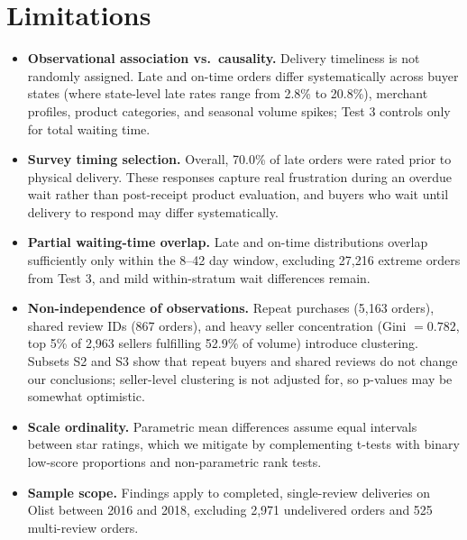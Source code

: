 \documentclass[10pt,a4paper,twocolumn]{article}
\begin{document}
\section{Limitations}
\begin{itemize}
  \item \textbf{Observational association vs.\ causality.} Delivery timeliness is not randomly assigned. Late and
  on-time orders differ systematically across buyer states (where state-level late rates range from 2.8\% to 20.8\%),
  merchant profiles, product categories, and seasonal volume spikes; Test 3 controls only for total waiting time.
  \item \textbf{Survey timing selection.} Overall, 70.0\% of late orders were rated prior to physical delivery. These
  responses capture real frustration during an overdue wait rather than post-receipt product evaluation, and buyers who
  wait until delivery to respond may differ systematically.
  \item \textbf{Partial waiting-time overlap.} Late and on-time distributions overlap sufficiently only within the
  8--42 day window, excluding 27,216 extreme orders from Test 3, and mild within-stratum wait differences remain.
  \item \textbf{Non-independence of observations.} Repeat purchases (5,163 orders), shared review IDs (867 orders),
  and heavy seller concentration (Gini $=0.782$, top 5\% of 2,963 sellers fulfilling 52.9\% of volume) introduce
  clustering. Subsets S2 and S3 show that repeat buyers and shared reviews do not change our conclusions; seller-level
  clustering is not adjusted for, so p-values may be somewhat optimistic.
  \item \textbf{Scale ordinality.} Parametric mean differences assume equal intervals between star ratings, which we
  mitigate by complementing t-tests with binary low-score proportions and non-parametric rank tests.
  \item \textbf{Sample scope.} Findings apply to completed, single-review deliveries on Olist between 2016 and 2018,
  excluding 2,971 undelivered orders and 525 multi-review orders.
\end{itemize}
\end{document}
